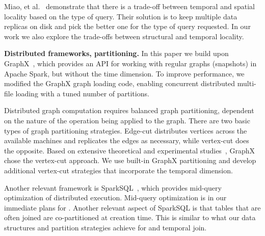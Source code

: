 Miao, et al.~\cite{DBLP:journals/tos/MiaoHLWYZPCC15} demonstrate that
there is a trade-off between temporal and spatial locality based on the
type of query.  Their solution is to keep multiple data replicas on
disk and pick the better one for the type of query requested.  In our
work we also explore the trade-offs between structural and temporal
locality.  

{\bf Distributed frameworks, partitioning.}  In this paper we build
upon GraphX~\cite{DBLP:conf/osdi/GonzalezXDCFS14}, which provides an
API for working with regular graphs (snapshots) in Apache Spark, but
without the time dimension.  To improve performance, we modified the
GraphX graph loading code, enabling concurrent distributed multi-file
loading with a tuned number of partitions.

Distributed graph computation requires balanced graph partitioning,
dependent on the nature of the operation being applied to the graph.
There are two basic types of graph partitioning strategies.  Edge-cut
distributes vertices across the available machines and replicates the
edges as necessary, while vertex-cut does the opposite.  Based on
extensive theoretical and experimental studies~\cite{Gonzalez2012},
GraphX chose the vertex-cut approach.  We use built-in GraphX
partitioning and develop additional vertex-cut strategies that
incorporate the temporal dimension.

Another relevant framework is SparkSQL~\cite{Xin2013}, which provides
mid-query optimization of distributed execution.  Mid-query
optimization is in our immediate plans for \ql.  Another relevant
aspect of SparkSQL is that tables that are often joined are
co-partitioned at creation time.  This is similar to what our data
structures and partition strategies achieve for  and
temporal join.


